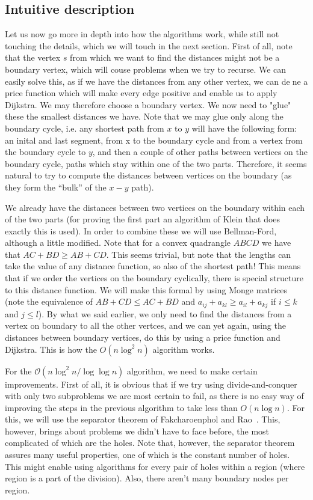 \documentclass[12pt]{article}
\begin{document}
\subsection{Intuitive description}
\label{sec:intu-descr}


Let us now go more in depth into how the algorithms work, while still not touching the details, which we will touch in the next section. First of all, note that the vertex $s$ from which we want to find the distances might not be a boundary vertex, which will couse problems when we try to recurse. We can easily solve this, as if we have the distances from any other vertex, we can dene a price function which will make every edge positive and enable us to apply Dijkstra. We may therefore choose a boundary vertex. We now need to "glue" these the smallest distances we have. Note that we may glue only along the boundary cycle, i.e. any shortest path from $x$ to $y$ will have the following form: an inital and last segment, from x to the boundary cycle and from a vertex from the boundary cycle to $y$, and then a couple of other paths between vertices on the boundary cycle, paths which stay within one of the two parts. Therefore, it seems natural to try to compute the distances between vertices on the boundary (as they form the ``bulk'' of the $x-y$ path).

We already have the distances between two vertices on the boundary within each of the two parts (for proving the first part an algorithm of Klein that does exactly this is used). In order to combine these we will use Bellman-Ford, although a little modified. Note that for a convex quadrangle $ABCD$ we have that $AC + BD \geq AB + CD$. This seems trivial, but note that the lengths can take the value of any distance function, so also of the shortest path! This means that if we order the vertices on the boundary cyclically, there is special structure to this distance function. We will make this formal by using Monge matrices (note the equivalence of $AB + CD \leq AC + BD$ and $a_{ij} + a_{kl} \geq a_{il} + a_{kj}$ if $i \leq k$ and $j \leq l$). By what we said earlier, we only need to find the distances from a vertex on boundary to all the other vertces, and we can yet again, using the distances between boundary vertices, do this by using a price function and Dijkstra. This is how the $O(n \log^2 n)$ algorithm works.

For the $\mathcal{O}(n \log^2 n/ \log \log n)$ algorithm, we need to make certain improvements. First of all, it is obvious that if we try using divide-and-conquer with only two subproblems we are most certain to fail, as there is no easy way of improving the steps in the previous algorithm to take less than $O(n \log n)$. For this, we will use the separator theorem of Fakcharoenphol and Rao~\cite{fakcharoenphol2001planar}. This, however, brings about problems we didn’t have to face before, the most complicated of which are the holes. Note that, however, the separator theorem assures many useful properties, one of which is the constant number of holes. This might enable using algorithms for every pair of holes within a region (where region is a part of the division). Also, there aren’t many boundary nodes per region.
\end{document}
